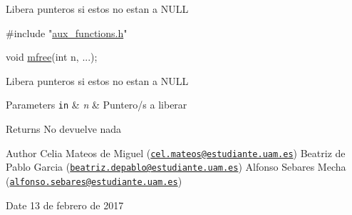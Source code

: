 Libera punteros si estos no estan a N\-U\-L\-L


\begin{DoxyCode}
\textcolor{preprocessor}{#include "\hyperlink{aux__functions_8h}{aux\_functions.h}"}

\textcolor{keywordtype}{void} \hyperlink{aux__functions_8h_a2480cc4793bf25a16cc731dc9d033582}{mfree}(\textcolor{keywordtype}{int} n, ...);
\end{DoxyCode}


Libera punteros si estos no estan a N\-U\-L\-L


\begin{DoxyParams}[1]{Parameters}
\mbox{\tt in}  & {\em n} & Puntero/s a liberar\\
\hline
\end{DoxyParams}
\begin{DoxyReturn}{Returns}
No devuelve nada
\end{DoxyReturn}
\begin{DoxyAuthor}{Author}
Celia Mateos de Miguel (\href{mailto:cel.mateos@estudiante.uam.es}{\tt cel.\-mateos@estudiante.\-uam.\-es}) Beatriz de Pablo Garcia (\href{mailto:beatriz.depablo@estudiante.uam.es}{\tt beatriz.\-depablo@estudiante.\-uam.\-es}) Alfonso Sebares Mecha (\href{mailto:alfonso.sebares@estudiante.uam.es}{\tt alfonso.\-sebares@estudiante.\-uam.\-es})
\end{DoxyAuthor}
\begin{DoxyDate}{Date}
13 de febrero de 2017
\end{DoxyDate}


 